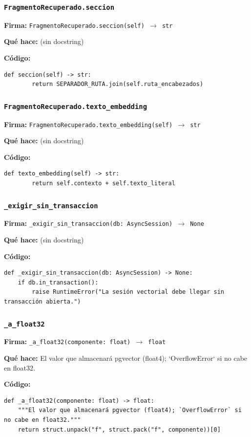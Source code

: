 \documentclass[11pt,a4paper]{article}
\begin{document}
\subsubsection*{\texttt{FragmentoRecuperado.seccion}}
\textbf{Firma:} \texttt{FragmentoRecuperado.seccion(self) $\rightarrow$ str}

\textbf{Qué hace:} (sin docstring)

\textbf{Código:}
\begin{lstlisting}
def seccion(self) -> str:
        return SEPARADOR_RUTA.join(self.ruta_encabezados)
\end{lstlisting}

\subsubsection*{\texttt{FragmentoRecuperado.texto\_embedding}}
\textbf{Firma:} \texttt{FragmentoRecuperado.texto\_embedding(self) $\rightarrow$ str}

\textbf{Qué hace:} (sin docstring)

\textbf{Código:}
\begin{lstlisting}
def texto_embedding(self) -> str:
        return self.contexto + self.texto_literal
\end{lstlisting}

\subsubsection*{\texttt{\_exigir\_sin\_transaccion}}
\textbf{Firma:} \texttt{\_exigir\_sin\_transaccion(db: AsyncSession) $\rightarrow$ None}

\textbf{Qué hace:} (sin docstring)

\textbf{Código:}
\begin{lstlisting}
def _exigir_sin_transaccion(db: AsyncSession) -> None:
    if db.in_transaction():
        raise RuntimeError("La sesión vectorial debe llegar sin transacción abierta.")
\end{lstlisting}

\subsubsection*{\texttt{\_a\_float32}}
\textbf{Firma:} \texttt{\_a\_float32(componente: float) $\rightarrow$ float}

\textbf{Qué hace:} El valor que almacenará pgvector (float4); `OverflowError` si no cabe en float32.

\textbf{Código:}
\begin{lstlisting}
def _a_float32(componente: float) -> float:
    """El valor que almacenará pgvector (float4); `OverflowError` si no cabe en float32."""
    return struct.unpack("f", struct.pack("f", componente))[0]
\end{lstlisting}
\end{document}
